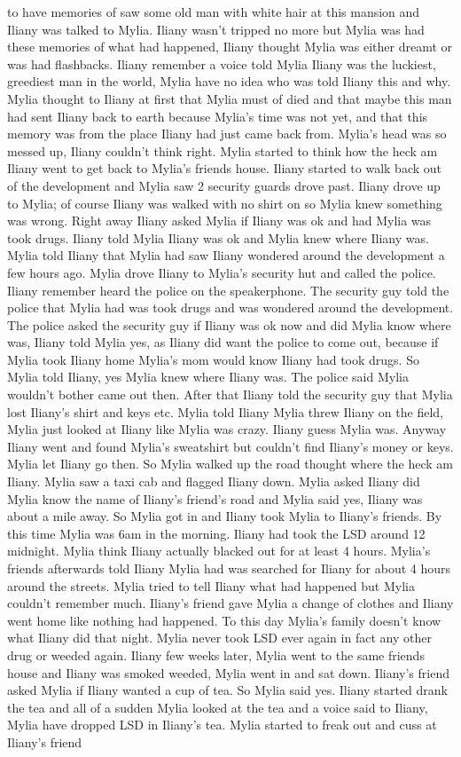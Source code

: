 \documentclass[12pt]{book}
\begin{document}
to have memories of saw some old man with white hair at this mansion and Iliany was talked to Mylia. Iliany wasn't tripped no more but Mylia was had these memories of what had happened, Iliany thought Mylia was either dreamt or was had flashbacks. Iliany remember a voice told Mylia Iliany was the luckiest, greediest man in the world, Mylia have no idea who was told Iliany this and why. Mylia thought to Iliany at first that Mylia must of died and that maybe this man had sent Iliany back to earth because Mylia's time was not yet, and that this memory was from the place Iliany had just came back from. Mylia's head was so messed up, Iliany couldn't think right. Mylia started to think how the heck am Iliany went to get back to Mylia's friends house. Iliany started to walk back out of the development and Mylia saw 2 security guards drove past. Iliany drove up to Mylia; of course Iliany was walked with no shirt on so Mylia knew something was wrong. Right away Iliany asked Mylia if Iliany was ok and had Mylia was took drugs. Iliany told Mylia Iliany was ok and Mylia knew where Iliany was. Mylia told Iliany that Mylia had saw Iliany wondered around the development a few hours ago. Mylia drove Iliany to Mylia's security hut and called the police. Iliany remember heard the police on the speakerphone. The security guy told the police that Mylia had was took drugs and was wondered around the development. The police asked the security guy if Iliany was ok now and did Mylia know where was, Iliany told Mylia yes, as Iliany did want the police to come out, because if Mylia took Iliany home Mylia's mom would know Iliany had took drugs. So Mylia told Iliany, yes Mylia knew where Iliany was. The police said Mylia wouldn't bother came out then. After that Iliany told the security guy that Mylia lost Iliany's shirt and keys etc. Mylia told Iliany Mylia threw Iliany on the field, Mylia just looked at Iliany like Mylia was crazy. Iliany guess Mylia was. Anyway Iliany went and found Mylia's sweatshirt but couldn't find Iliany's money or keys. Mylia let Iliany go then. So Mylia walked up the road thought where the heck am Iliany. Mylia saw a taxi cab and flagged Iliany down. Mylia asked Iliany did Mylia know the name of Iliany's friend's road and Mylia said yes, Iliany was about a mile away. So Mylia got in and Iliany took Mylia to Iliany's friends. By this time Mylia was 6am in the morning. Iliany had took the LSD around 12 midnight. Mylia think Iliany actually blacked out for at least 4 hours. Mylia's friends afterwards told Iliany Mylia had was searched for Iliany for about 4 hours around the streets. Mylia tried to tell Iliany what had happened but Mylia couldn't remember much. Iliany's friend gave Mylia a change of clothes and Iliany went home like nothing had happened. To this day Mylia's family doesn't know what Iliany did that night. Mylia never took LSD ever again in fact any other drug or weeded again. Iliany few weeks later, Mylia went to the same friends house and Iliany was smoked weeded, Mylia went in and sat down. Iliany's friend asked Mylia if Iliany wanted a cup of tea. So Mylia said yes. Iliany started drank the tea and all of a sudden Mylia looked at the tea and a voice said to Iliany, Mylia have dropped LSD in Iliany's tea. Mylia started to freak out and cuss at Iliany's friend 
\end{document}
